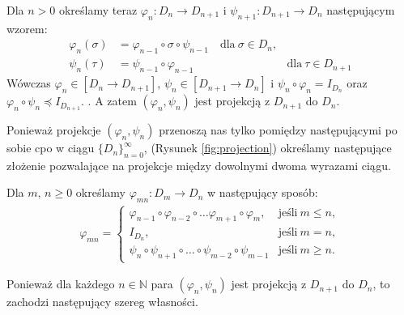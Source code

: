Dla \(n>0\) określamy teraz \(\varphi_n : D_n \to D_{n+1}\) i \(\psi_{n+1}: D_{n+1}\to D_n\) następującym wzorem:
\begin{align*}
  \varphi_n(\sigma) &= \varphi_{n-1}\circ\sigma\circ\psi_{n-1}\quad \text{dla}\ \sigma\in D_n,\\ 
  \psi_n(\tau) &= \psi_{n-1}\circ\varphi_{n-1}\quad &\text{dla}\ \tau \in D_{n+1}
\end{align*}
Wówczas \(\varphi_n\in[D_n\to D_{n+1}]\), \(\psi_n\in[D_{n+1}\to D_n]\) i \(\psi_n\circ\varphi_n=I_{D_n}\) oraz \(\varphi_n\circ\psi_n\preceq I_{D_{n+1}}.\) \cite[Lemat 16.28]{Hindley:2008:LCI:1388400}. A zatem \((\varphi_n,\psi_n)\) jest projekcją z \(D_{n+1}\) do \(D_n\).

Ponieważ projekcje \((\varphi_n, \psi_n)\) przenoszą nas tylko pomiędzy następującymi po sobie cpo w ciągu \(\{D_n\}_{n=0}^\infty\), (Rysunek \ref{fig:projection}) określamy następujące złożenie pozwalające na projekcje między dowolnymi dwoma wyrazami ciągu.

\begin{definicja}%
Dla \(m,\,n\geq 0\) określamy \(\varphi_{mn}:D_m \to D_n\) w następujący sposób:
\begin{align*}
\varphi_{mn} =
\begin{cases}
\varphi_{n-1} \circ \varphi_{n-2} \circ \dots \varphi_{m+1} \circ \varphi_m, & \text{jeśli}\ m\leq n,\\
I_{D_n}, & \text{jeśli}\ m=n,\\
\psi_n \circ \psi_{n+1} \circ \dots \circ \psi_{m-2}\circ \psi_{m-1} & \text{jeśli}\ m\geq n.
\end{cases}
\end{align*}
\end{definicja}

Ponieważ dla każdego \(n\in \mathbb{N}\) para \((\varphi_n, \psi_n)\) jest projekcją z \(D_{n+1}\) do \(D_n\), to zachodzi następujący szereg własności.


